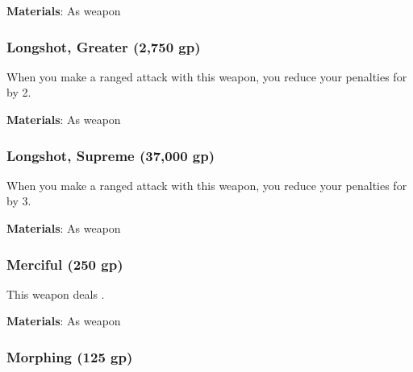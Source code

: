 \vspace{0.25em}
\textbf{Materials}: As weapon


\lowercase{\hypertarget{item:Longshot, Greater}{}}\label{item:Longshot, Greater}
\hypertarget{item:Longshot, Greater}{\subsubsection{Longshot, Greater\hfill{} (2,750 gp)}}

When you make a ranged attack with this weapon, you reduce your penalties for  by 2.



\vspace{0.25em}
\textbf{Materials}: As weapon


\lowercase{\hypertarget{item:Longshot, Supreme}{}}\label{item:Longshot, Supreme}
\hypertarget{item:Longshot, Supreme}{\subsubsection{Longshot, Supreme\hfill{} (37,000 gp)}}

When you make a ranged attack with this weapon, you reduce your penalties for  by 3.



\vspace{0.25em}
\textbf{Materials}: As weapon


\lowercase{\hypertarget{item:Merciful}{}}\label{item:Merciful}
\hypertarget{item:Merciful}{\subsubsection{Merciful\hfill{} (250 gp)}}

This weapon deals .



\vspace{0.25em}
\textbf{Materials}: As weapon


\lowercase{\hypertarget{item:Morphing}{}}\label{item:Morphing}
\hypertarget{item:Morphing}{\subsubsection{Morphing\hfill{} (125 gp)}}

